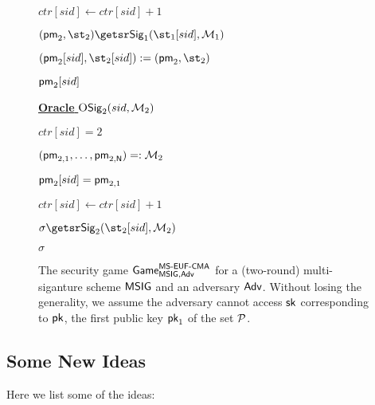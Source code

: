 \begin{definition}
\begin{itemize}
\begin{figure}[ht!]
{\begin{minipage}[t]{.45\textwidth}
\begin{nicodemus}
                    \item $ctr[sid] \gets ctr[sid]+1$
                    \item $(\pmsg_2, \st_2) \getsr \Sig_1(\st_1[sid], \MSet_1)$
                    \item $(\pmsg_2[sid], \st_2[sid]) \gets (\pmsg_2, \st_2)$
                    \item \pcreturn $\mathsf{pm}_2[sid]$
			\end{nicodemus}
                \medskip
                \underline{\textbf{Oracle} ${\textsc{O}}{\mathsf{Sig}}_2(sid, \mathcal{M}_2)$}
                \begin{nicodemus}
				\item \pccheck $ctr[sid] = 2$
                    \item \pcparse $(\mathsf{pm}_{2,1}, \ldots, \mathsf{pm}_{2, \mathsf{N}}) =:\mathcal{M}_2$
                    \item \pccheck $\mathsf{pm}_2[sid] =  \mathsf{pm}_{2,1}$
                    \item $ctr[sid] \gets ctr[sid]+1$
                    \item $\sigma \getsr \Sig_2(\st_2[sid], \MSet_2)$
                    \item \pcreturn $\sigma$
			\end{nicodemus}
		\end{minipage}
	}%
	\caption{The security game $\mathsf{Game}_{\mathsf{MSIG}, {\textsf{Adv}}}^{\mathsf{MS}\text{-}\mathsf{EUF}\text{-}\mathsf{CMA}}$ for a (two-round) multi-siganture scheme $\mathsf{MSIG}$ and an adversary ${\textsf{Adv}}$. Without losing the generality, we assume the adversary cannot access ${\mathsf{sk}}$ corresponding to ${\mathsf{pk}}$, the first public key ${\mathsf{pk}}_1$ of the set $\mathcal{P}$.}
	\label{fig:def-mseufcma}
        \end{figure}
    \end{itemize}
\end{definition}

\subsection{Some New Ideas}

Here we list some of the ideas:

